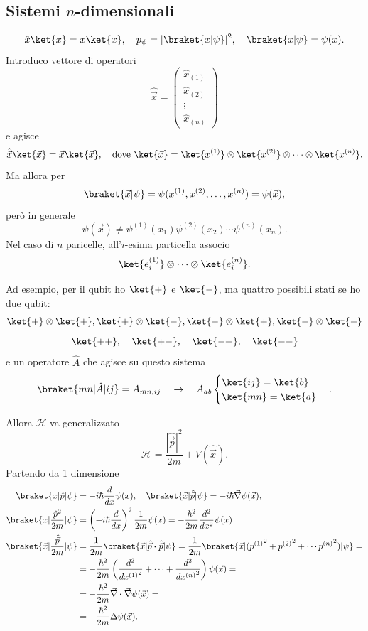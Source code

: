 \subsection{Sistemi \(n\)-dimensionali}

\[
\hat{x} \ket{x} = x \ket{x}, \quad p_\psi = |\braket{x|\psi}|^2, \quad \braket{x|\psi} = \psi(x).
\]
Introduco vettore di operatori
\[
\hat{\vec{x}} = \begin{pmatrix}
\hat{x}_{(1)} \\ \hat{x}_{(2)} \\ \vdots \\ \hat{x}_{(n)}
\end{pmatrix}
\]
e agisce
\[
\hat{\vec{x}}\ket{\vec{x}} = \vec{x} \ket{\vec{x}}, \quad \text{dove } \ket{\vec{x}} = \ket{x^{(1)}} \otimes \ket{x^{(2)}} \otimes \cdots \otimes \ket{x^{(n)}}.
\]
Ma allora per
\[
\braket{\vec{x}|\psi} = \psi(x^{(1)}, x^{(2)}, \dots, x^{(n)}) = \psi(\vec{x}),
\]
però in generale
\[
\psi(\vec{x}) \neq \psi^{(1)}(x_1) \psi^{(2)}(x_2) \cdots \psi^{(n)}(x_n).
\]
Nel caso di \( n \) paricelle, all'\(i\)-esima particella associo
\[
\ket{e_i^{(1)}} \otimes \cdots \otimes \ket{e_i^{(n)}}.
\]

Ad esempio, per il qubit ho \( \ket{+} \) e \( \ket{-} \), ma quattro possibili stati se ho due qubit:
\[
\ket{+} \otimes \ket{+}, \ket{+} \otimes \ket{-}, \ket{-} \otimes \ket{+}, \ket{-} \otimes \ket{-}
\]
\[
\ket{++}, \quad \ket{+-}, \quad \ket{-+}, \quad \ket{--}
\]
e un operatore \( \hat{A} \) che agisce su questo sistema
\[
\braket{mn|\hat{A}|ij} = A_{mn,ij} \quad \rightarrow \quad A_{ab} \begin{cases}
\ket{ij} = \ket{b} \\
\ket{mn} = \ket{a}
\end{cases}.
\]

Allora \( \mathcal{H} \) va generalizzato
\[
\mathcal{H} = \frac{\left| \hat{\vec{p}} \right|^2}{2m} + V(\hat{\vec{x}}).
\]
Partendo da 1 dimensione
\begin{align*}
\braket{x|\hat{p}|\psi} &= -i\hbar \frac{d}{dx} \psi(x), \quad \braket{\vec{x}|\hat{\vec{p}}|\psi} = -i\hbar \vec{\nabla} \psi(\vec{x}), \\
\braket{x|\frac{\hat{p}^2}{2m}|\psi} &= \left( -i\hbar \frac{d}{dx} \right)^2 \frac{1}{2m} \psi(x) = -\frac{\hbar^2}{2m} \frac{d^2}{dx^2} \psi(x) \\
\braket{\vec{x}|\frac{\hat{\vec{p}}}{2m}|\psi} &= \frac{1}{2m} \braket{\vec{x}|\hat{\vec{p}} \boldsymbol{\cdot} \hat{\vec{p}}|\psi} = \frac{1}{2m} \braket{\vec{x}|({p^{(1)}}^2 + {p^{(2)}}^2 + \cdots {p^{(n)}}^2)|\psi} = \\
&= -\frac{\hbar^2}{2m} \left( \frac{d^2}{d{x^{(1)}}^2} + \cdots + \frac{d^2}{d{x^{(n)}}^2} \right) \psi(\vec{x}) = \\
&= -\frac{\hbar^2}{2m} \vec{\nabla} \boldsymbol{\cdot} \vec{\nabla} \psi(\vec{x}) = \\
&= -\frac{\hbar^2}{2m} \Delta \psi(\vec{x}).
\end{align*}